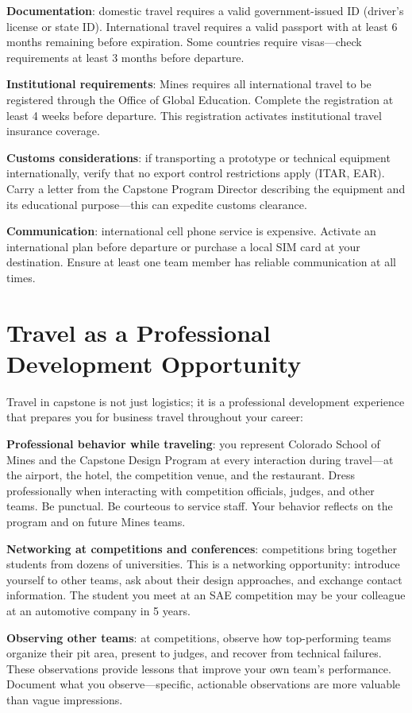 \textbf{Documentation}: domestic travel requires a valid government-issued ID (driver's license or state ID). International travel requires a valid passport with at least 6 months remaining before expiration. Some countries require visas---check requirements at least 3 months before departure.

\textbf{Institutional requirements}: Mines requires all international travel to be registered through the Office of Global Education. Complete the registration at least 4 weeks before departure. This registration activates institutional travel insurance coverage.

\textbf{Customs considerations}: if transporting a prototype or technical equipment internationally, verify that no export control restrictions apply (ITAR, EAR). Carry a letter from the Capstone Program Director describing the equipment and its educational purpose---this can expedite customs clearance.

\textbf{Communication}: international cell phone service is expensive. Activate an international plan before departure or purchase a local SIM card at your destination. Ensure at least one team member has reliable communication at all times.



\section{Travel as a Professional Development Opportunity}
Travel in capstone is not just logistics; it is a professional development experience that prepares you for business travel throughout your career:

\textbf{Professional behavior while traveling}: you represent Colorado School of Mines and the Capstone Design Program at every interaction during travel---at the airport, the hotel, the competition venue, and the restaurant. Dress professionally when interacting with competition officials, judges, and other teams. Be punctual. Be courteous to service staff. Your behavior reflects on the program and on future Mines teams.

\textbf{Networking at competitions and conferences}: competitions bring together students from dozens of universities. This is a networking opportunity: introduce yourself to other teams, ask about their design approaches, and exchange contact information. The student you meet at an SAE competition may be your colleague at an automotive company in 5 years.

\textbf{Observing other teams}: at competitions, observe how top-performing teams organize their pit area, present to judges, and recover from technical failures. These observations provide lessons that improve your own team's performance. Document what you observe---specific, actionable observations are more valuable than vague impressions.

